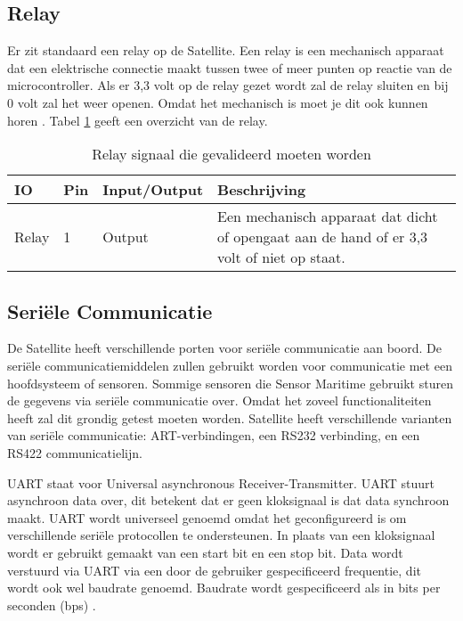 \subsection{Relay}
Er zit standaard een relay op de Satellite. Een relay is een mechanisch apparaat dat een elektrische connectie maakt tussen twee of meer punten op reactie van de microcontroller. Als er 3,3 volt op de relay gezet wordt zal de relay sluiten en bij 0 volt zal het weer openen. Omdat het mechanisch is moet je dit ook kunnen horen \autocite{relay}. Tabel \ref{tab:hw_val_relay} geeft een overzicht van de relay.

\begin{table}[h!]
	\caption{Relay signaal die gevalideerd moeten worden}
	\begin{tabular}{lllp{12cm}}
	\toprule
	\textbf{IO} & \textbf{Pin} & \textbf{Input/Output} & \textbf{Beschrijving}			\\ \toprule
	Relay		& 1   	& Output		& Een mechanisch apparaat dat dicht of opengaat aan de hand of er 3,3 volt of niet op staat.	\\ \bottomrule
	\end{tabular}
	\label{tab:hw_val_relay}
\end{table}

\subsection{Seriële Communicatie}
De Satellite heeft verschillende porten voor seriële communicatie aan boord. De seriële communicatiemiddelen zullen gebruikt worden voor communicatie met een hoofdsysteem of sensoren. Sommige sensoren die Sensor Maritime gebruikt sturen de gegevens via seriële communicatie over. Omdat het zoveel functionaliteiten heeft zal dit grondig getest moeten worden. Satellite heeft verschillende varianten van seriële communicatie: ART-verbindingen, een RS232 verbinding, en een RS422 communicatielijn. \newline

\noindent UART staat voor Universal asynchronous Receiver-Transmitter. UART stuurt asynchroon data over, dit betekent dat er geen kloksignaal is dat data synchroon maakt. UART wordt universeel genoemd omdat het geconfigureerd is om verschillende seriële protocollen te ondersteunen. In plaats van een kloksignaal wordt er gebruikt gemaakt van een start bit en een stop bit. Data wordt verstuurd via UART via een door de gebruiker gespecificeerd frequentie, dit wordt ook wel baudrate genoemd. Baudrate wordt gespecificeerd als in bits per seconden (bps) \autocite{UART}. \newline

